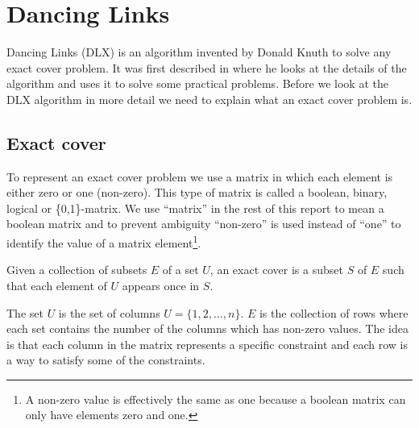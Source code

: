 
\chapter{Dancing Links}
\label{dancing_links}

Dancing Links (DLX) is an algorithm invented by Donald Knuth to solve any exact cover problem.
It was first described in \cite{knuth00dancing} where he looks at the details of the algorithm and uses it to solve some practical problems.
Before we look at the DLX algorithm in more detail we need to explain what an exact cover problem is.



\section{Exact cover}
\label{exact_cover}

To represent an exact cover problem we use a matrix in which each element is either zero or one (non-zero).
This type of matrix is called a boolean, binary, logical or \{0,1\}-matrix.
We use ``matrix'' in the rest of this report to mean a boolean matrix and to prevent ambiguity ``non-zero'' is used instead of ``one'' to identify the value of a matrix element\footnote{A non-zero value is effectively the same as one because a boolean matrix can only have elements zero and one.}.

\begin{definition}
Given a collection of subsets $E$ of a set $U$, an exact cover is a subset $S$ of $E$ such that each element of $U$ appears once in $S$.
\end{definition}

The set $U$ is the set of columns $U = \{ 1, 2, \ldots, n \}$.
$E$ is the collection of rows where each set contains the number of the columns which has non-zero values.
The idea is that each column in the matrix represents a specific constraint and each row is a way to satisfy some of the constraints.

